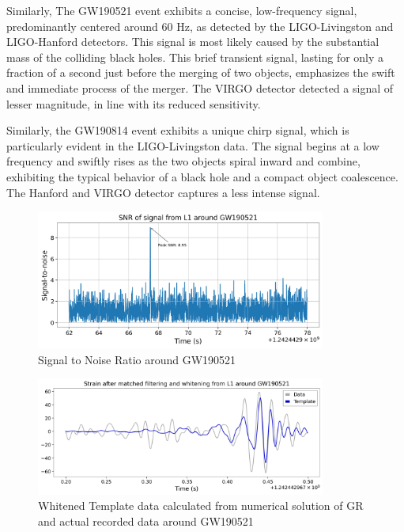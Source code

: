 Similarly, The GW190521 event exhibits a concise, low-frequency signal, predominantly centered around 60 Hz, as detected by the LIGO-Livingston and LIGO-Hanford detectors. This signal is most likely caused by the substantial mass of the colliding black holes. This brief transient signal, lasting for only a fraction of a second just before the merging of two objects, emphasizes the swift and immediate process of the merger. The VIRGO detector detected a signal of lesser magnitude, in line with its reduced sensitivity.

Similarly, the GW190814 event exhibits a unique chirp signal, which is particularly evident in the LIGO-Livingston data. The signal begins at a low frequency and swiftly rises as the two objects spiral inward and combine, exhibiting the typical behavior of a black hole and a compact object coalescence. The Hanford and VIRGO detector captures a less intense signal.

\begin{figure}[h]
            \centering          
            \includegraphics[width=0.85\textwidth]{GWanalysisProject_codefile/SNRplot/SNRL1GW190521.png}
            \caption{Signal to Noise Ratio around GW190521}
            \label{fig:GW190521SNR}
\end{figure}

\begin{figure}[h]
            \centering          
            \includegraphics[width=0.85\textwidth]{GWanalysisProject_codefile/templateplot/templateL1GW190521.png}
            \caption{Whitened Template data calculated from numerical solution of GR and actual recorded data around GW190521}
            \label{fig:GW190521template}
\end{figure}


